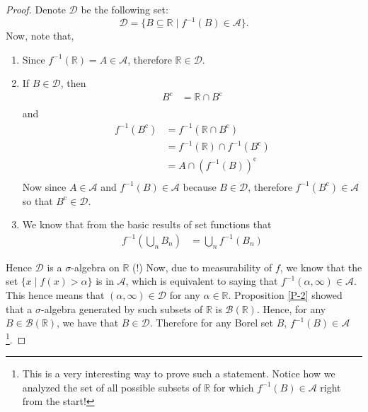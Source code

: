 \documentclass{article}
\theoremstyle{definition}
\theoremstyle{remark}
\theoremstyle{definition}
\theoremstyle{definition}
\theoremstyle{definition}
\newcommand{\intrs}{\cap}
\newcommand{\bunion}{\bigcup}
\newcommand{\where}{\;\vert\;}
\newcommand{\R}{\mathbb{R}}
\newcommand{\alg}[1]{\mathscr{#1}}
\newcommand{\bor}[1]{\mathscr{B}(#1)}
\newcommand{\comp}[1]{#1^{\text{c}}}
\newcommand{\inv}[1]{{#1}^{-1}}
\begin{document}
\begin{proof}
	Denote $ \alg{D} $ be the following set:
	\[\alg{D} = \{B\subseteq \R\where \inv{f}(B) \in \alg{A}\}.\]
	Now, note that,
	\begin{enumerate}
		\item {Since $ \inv{f}(\R) = A \in \alg{A}$, therefore $ \R \in \alg{D} $.}
		\item {If $ B \in \alg{D} $, then 
	\begin{equation*}
		\begin{split}
			\comp{B} &= \R \intrs \comp{B}\\
		\end{split}
	\end{equation*}	
and
\begin{equation*}
	\begin{split}
		\inv{f}(\comp{B}) &= \inv{f}(\R\intrs \comp{B})\\
		&= \inv{f}(\R) \intrs \inv{f}(\comp{B})\\
		&=A\intrs \left (\inv{f}(B)\right )^{\text{c}}\\
	\end{split}
\end{equation*}
Now since $ A \in \alg{A}$ and $ \inv{f}(B) \in \alg{A} $ because $ B\in \alg{D} $, therefore $ \inv{f}(\comp{B})\in \alg{A} $ so that $ \comp{B} \in \alg{D} $.
	}
\item {We know that from the basic results of set functions that
\begin{equation*}
	\begin{split}
		\inv{f}\left (\bunion_n B_n\right ) &= \bunion_n \inv{f}(B_n)
	\end{split}
\end{equation*}
}
	\end{enumerate}
Hence $ \alg{D} $ is a $ \sigma $-algebra on $ \R $ (!) Now, due to measurability of $ f $, we know that the set $ \{x\where f(x)>\alpha\} $ is in $ \alg{A} $, which is equivalent to saying that $ \inv{f}(\alpha,\infty) \in \alg{A}$. This hence means that $ (\alpha,\infty) \in \alg{D} $ for any $ \alpha\in \R $. Proposition \ref{P-2} showed that a $ \sigma$-algebra generated by such subsets of $ \R $ is $ \bor{\R} $. Hence, for any $ B\in \bor{\R} $, we have that $ B\in \alg{D} $. Therefore for any Borel set $ B $, $\inv{f}(B) \in \alg{A}$\footnote{This is a very interesting way to prove such a statement. Notice how we analyzed the set of all possible subsets of $ \R $ for which $ \inv{f}(B) \in \alg{A}$ right from the start!}.
\end{proof}
\hrulefill
\newpage
\end{document}
